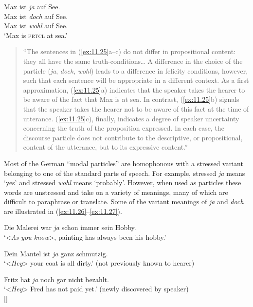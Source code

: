 \ea \label{ex:11.25}
\ea  Max ist \textit{ja} auf See.\\
\ex Max ist \textit{doch} auf See.\\
\ex Max ist \textit{wohl} auf See.\\
‘Max is \textsc{prtcl} at sea.’
\z
\z

\begin{quote}
“The sentences in (\ref{ex:11.25}a–c) do not differ in propositional content: they all have the same truth-conditions… A difference in the choice of the particle (\textit{ja}, \textit{doch}, \textit{wohl}) leads to a difference in felicity conditions, however, such that each sentence will be appropriate in a different context. As a first approximation, (\ref{ex:11.25}a) indicates that the speaker takes the hearer to be aware of the fact that Max is at sea. In contrast, (\ref{ex:11.25}b) signals that the speaker takes the hearer not to be aware of this fact at the time of utterance. (\ref{ex:11.25}c), finally, indicates a degree of speaker uncertainty concerning the truth of the proposition expressed. In each case, the discourse particle does not contribute to the descriptive, or propositional, content of the utterance, but to its expressive content.”
\end{quote}
\z


Most of the German “modal particles” are homophonous with a stressed variant belonging to one of the standard parts of speech. For example, stressed \textit{ja} means ‘yes’ and stressed \textit{wohl} means ‘probably’. However, when used as particles these words are unstressed and take on a variety of meanings, many of which are difficult to paraphrase or translate. Some of the variant meanings of \textit{ja} and \textit{doch} are illustrated in (\ref{ex:11.26}--\ref{ex:11.27}).


\ea \label{ex:11.26}
\ea  Die Malerei war \textit{ja} schon immer sein Hobby.\\
\glt ‘<\textit{As you know}>, painting has always been his hobby.’

\ex  Dein Mantel ist \textit{ja} ganz schmutzig.\\
\glt ‘<\textit{Hey}> your coat is all dirty.’ (not previously known to hearer)

\ex Fritz hat \textit{ja} noch gar nicht bezahlt.\\
\glt ‘<\textit{Hey}> Fred has not paid yet.’ (newly discovered by speaker)\\
{}[\citealt{König1991,KönigEtAl1990,Waltereit2001}]
\z \z

